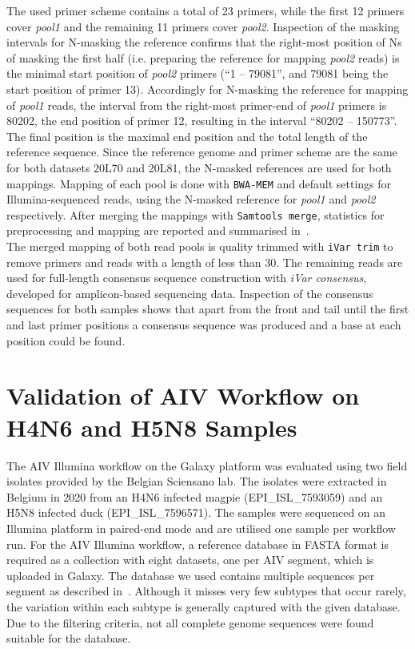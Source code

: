 The used primer scheme contains a total of 23 primers, while the first 12 primers cover \textit{pool1} and the remaining 11 primers cover \textit{pool2}. Inspection of the masking intervals for N-masking the reference confirms that the right-most position of Ns of masking the first half (i.e. preparing the reference for mapping \textit{pool2} reads) is the minimal start position of \textit{pool2} primers (``1 -- 79081'', and 79081 being the start position of primer 13). Accordingly for N-masking the reference for mapping of \textit{pool1} reads, the interval from the right-most primer-end of \textit{pool1} primers is 80202, the end position of primer 12, resulting in the interval ``80202 -- 150773''. The final position is the maximal end position and the total length of the reference sequence. Since the reference genome and primer scheme are the same for both datasets 20L70 and 20L81, the N-masked references are used for both mappings. Mapping of each pool is done with \texttt{BWA-MEM} and default settings for Illumina-sequenced reads, using the N-masked reference for \textit{pool1} and \textit{pool2} respectively. After merging the mappings with \texttt{Samtools merge}, statistics for preprocessing and mapping are reported and summarised in~. \\
The merged mapping of both read pools is quality trimmed with \texttt{iVar trim} to remove primers and reads with a length of less than 30. The remaining reads are used for full-length consensus sequence construction with \textit{iVar consensus}, developed for amplicon-based sequencing data. Inspection of the consensus sequences for both samples shows that apart from the front and tail until the first and last primer positions a consensus sequence was produced and a base at each position could be found.


\section{Validation of AIV Workflow on H4N6 and H5N8 Samples}\label{sec:4-aiv}
The \ac{AIV} Illumina workflow on the Galaxy platform was evaluated using two field isolates provided by the Belgian Sciensano lab. The isolates were extracted in Belgium in 2020 from an H4N6 infected magpie (EPI\_ISL\_7593059) and an H5N8 infected duck (EPI\_ISL\_7596571). The samples were sequenced on an Illumina platform in paired-end mode and are utilised one sample per workflow run. For the \ac{AIV} Illumina workflow, a reference database in FASTA format is required as a collection with eight datasets, one per \ac{AIV} segment, which is uploaded in Galaxy. The database we used contains multiple sequences per segment as described in~. Although it misses very few subtypes that occur rarely, the variation within each subtype is generally captured with the given database. Due to the filtering criteria, not all complete genome sequences were found suitable for the database.

